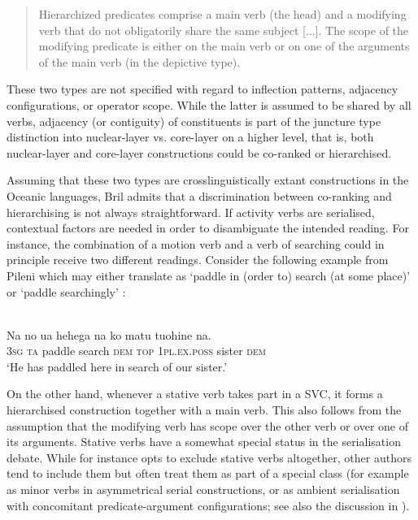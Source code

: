 \begin{quote}Hierarchized predicates comprise a main verb (the head) and a modifying verb that do not obligatorily share the same subject [...]. The scope of the modifying predicate is either on the main verb or on one of the arguments of the main verb (in the
depictive type). \citep[270]{bril2007nexus}\end{quote}

These two types are not specified with regard to inflection patterns, adjacency configurations, or operator scope. While the latter is assumed to be shared by all verbs, adjacency (or contiguity) of constituents is part of the juncture type distinction into nuclear-layer vs. core-layer on a higher level, that is, both nuclear-layer and core-layer constructions could be co-ranked or hierarchised.

Assuming that these two types are crosslinguistically extant constructions in the Oceanic languages, Bril admits that a discrimination between co-ranking and hierarchising is not always straightforward. If activity verbs are serialised, contextual factors are needed in order to disambiguate the intended reading. For instance, the combination of a motion verb and a verb of searching could in principle receive two different readings. Consider the following example from Pileni which may either translate as `paddle in (order to) search (at some place)' or `paddle searchingly' \citep[271]{bril2007nexus}:

\ea 
{}\\
\gll Na no ua hehega na ko matu tuohine na. \\
\textsc{3}\textsc{sg} \textsc{ta} paddle search \textsc{dem} \textsc{top} \textsc{1}\textsc{pl}.\textsc{ex}.\textsc{poss} sister \textsc{dem} \\
\glft `He has paddled here in search of our sister.’\\ 
\z

On the other hand, whenever a stative verb takes part in a SVC, it forms a hierarchised construction together with a main verb. This also follows from the assumption that the modifying verb has scope over the other verb or over one of its arguments. Stative verbs have a somewhat special status in the serialisation debate. While for instance \citet{haspelmath2016serial} opts to exclude stative verbs altogether, other authors tend to include them but often treat them as part of a special class (for example as minor verbs in asymmetrical serial constructions, or as ambient serialisation with concomitant predicate-argument configurations; see also the discussion in ). 

